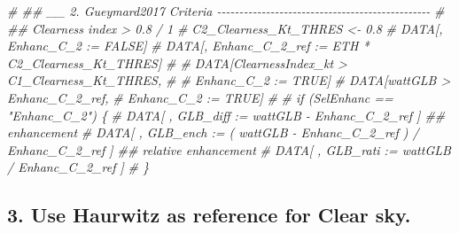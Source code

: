 \documentclass[
  10pt,
  a4paper,oneside]{article}
\newenvironment{Shaded}{\begin{snugshade}}{\end{snugshade}}
\newcommand{\CommentTok}[1]{\textcolor[rgb]{0.56,0.35,0.01}{\textit{#1}}}
\begin{document}
\begin{Shaded}
\begin{Highlighting}[]
\CommentTok{\# \#\# \_\_ 2. Gueymard2017 Criteria  {-}{-}{-}{-}{-}{-}{-}{-}{-}{-}{-}{-}{-}{-}{-}{-}{-}{-}{-}{-}{-}{-}{-}{-}{-}{-}{-}{-}{-}{-}{-}{-}{-}{-}{-}{-}{-}{-}{-}{-}{-}{-}{-}{-}{-}{-}{-}{-}}
\CommentTok{\# \#\# Clearness index \textgreater{} 0.8 / 1}
\CommentTok{\# C2\_Clearness\_Kt\_THRES \textless{}{-} 0.8}
\CommentTok{\# DATA[, Enhanc\_C\_2 := FALSE]}
\CommentTok{\# DATA[, Enhanc\_C\_2\_ref := ETH * C2\_Clearness\_Kt\_THRES]}
\CommentTok{\# \# DATA[ClearnessIndex\_kt \textgreater{} C1\_Clearness\_Kt\_THRES,}
\CommentTok{\# \#      Enhanc\_C\_2 := TRUE]}
\CommentTok{\# DATA[wattGLB \textgreater{} Enhanc\_C\_2\_ref,}
\CommentTok{\#      Enhanc\_C\_2 := TRUE]}
\CommentTok{\#}
\CommentTok{\# if (SelEnhanc == "Enhanc\_C\_2") \{}
\CommentTok{\#   DATA[ , GLB\_diff :=   wattGLB {-} Enhanc\_C\_2\_ref                    ] \#\# enhancement}
\CommentTok{\#   DATA[ , GLB\_ench := ( wattGLB {-} Enhanc\_C\_2\_ref ) / Enhanc\_C\_2\_ref ] \#\# relative enhancement}
\CommentTok{\#   DATA[ , GLB\_rati :=   wattGLB / Enhanc\_C\_2\_ref                    ]}
\CommentTok{\# \}}
\end{Highlighting}
\end{Shaded}

\hypertarget{use-haurwitz-as-reference-for-clear-sky.}{%
\subsection{3. Use Haurwitz as reference for Clear sky.}\label{use-haurwitz-as-reference-for-clear-sky.}}
\end{document}
